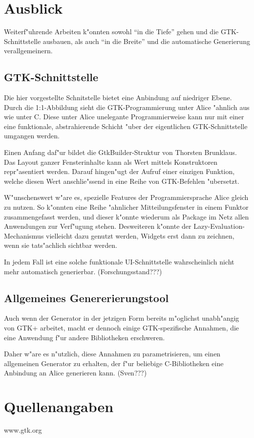 \documentclass{article}
\begin{document}

\section{Ausblick}

Weiterf"uhrende Arbeiten k"onnten sowohl ``in die Tiefe'' gehen und die
GTK-Schnittstelle ausbauen, als auch ``in die Breite'' und die automatische
Generierung verallgemeinern.

\subsection{GTK-Schnittstelle}

Die hier vorgestellte Schnitstelle bietet eine Anbindung auf niedriger Ebene.
Durch die 1:1-Abbildung sieht die GTK-Programmierung unter Alice "ahnlich
aus wie unter C. Diese unter Alice unelegante Programmierweise kann
nur mit einer eine funktionale, abstrahierende Schicht "uber der
eigentlichen GTK-Schnittstelle umgangen werden.

Einen Anfang daf"ur bildet die GtkBuilder-Struktur von Thorsten Brunklaus.
Das Layout ganzer Fensterinhalte kann als Wert mittels Konstruktoren
repr"asentiert werden. Darauf hingen"ugt der Aufruf einer einzigen Funktion,
welche diesen Wert anschlie"ssend in eine Reihe von GTK-Befehlen "ubersetzt.

W"unschenswert w"are es, spezielle Features der Programmiersprache Alice
gleich zu nutzen. So k"onnten eine Reihe "ahnlicher Mitteilungsfenster
in einem Funktor zusammengefasst werden, und dieser k"onnte wiederum als
Package im Netz allen Anwendungen zur Verf"ugung stehen. Desweiteren k"onnte
der Lazy-Evaluation-Mechanismus vielleicht dazu genutzt werden, Widgets erst
dann zu zeichnen, wenn sie tats"achlich sichtbar werden.

In jedem Fall ist eine solche funktionale UI-Schnittstelle wahrscheinlich
nicht mehr automatisch generierbar. (Forschungsstand???)

\subsection{Allgemeines Genererierungstool}

Auch wenn der Generator in der jetzigen Form bereits m"oglichst unabh"angig
von GTK+ arbeitet, macht er dennoch einige GTK-spezifische Annahmen, die
eine Anwendung f"ur andere Bibliotheken erschweren.

Daher w"are es n"utzlich, diese Annahmen zu parametrisieren, um einen
allgemeinen Generator zu erhalten, der f"ur beliebige C-Bibliotheken
eine Anbindung an Alice generieren kann. (Sven???)

\section{Quellenangaben}

www.gtk.org
\end{document}
